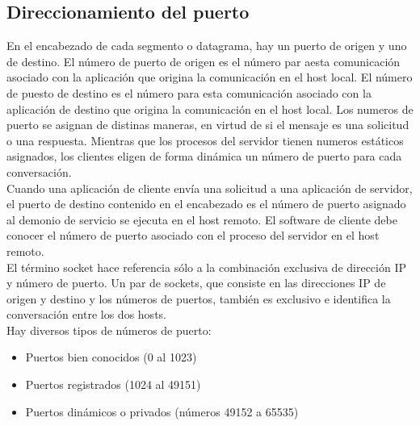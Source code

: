 \documentclass[12pt]{report}
\begin{document}
        \subsection{Direccionamiento del puerto}
        En el encabezado de cada segmento o datagrama, hay un puerto de origen y uno de destino.
        El número de puerto de origen es el número par aesta comunicación asociado con la aplicación que origina la comunicación en el host local.
        El número de puesto de destino es el número para esta comunicación asociado con la aplicación de destino que origina la comunicación en el host local.
        Los numeros de puerto se asignan de distinas maneras, en virtud de si el mensaje es una solicitud o una respuesta.  
        Mientras que los procesos del servidor tienen numeros estáticos asignados, los clientes eligen de forma dinámica un número de puerto para cada conversación.
        \\Cuando una aplicación de cliente envía una solicitud a una aplicación de servidor, el puerto de destino contenido en el encabezado es el número de puerto asignado al demonio de servicio se ejecuta en el host remoto.
        El software de cliente debe conocer el número de puerto asociado con el proceso del servidor en el host remoto.
        \\El término socket hace referencia sólo a la combinación exclusiva de dirección IP y número de puerto. Un par de sockets, que consiste en las direcciones IP de origen y destino y los números de puertos, también es exclusivo e identifica la conversación entre los dos hosts.
        \\Hay diversos tipos de números de puerto:
        \begin{itemize}
            \item Puertos bien conocidos (0 al 1023)
            \item Puertos registrados (1024 al 49151)
            \item Puertos dinámicos o privados (números 49152 a 65535)
        \end{itemize}
    
\end{document}
